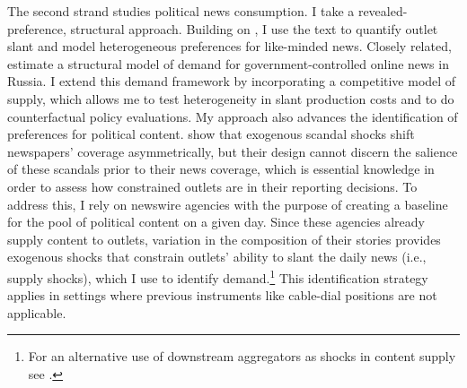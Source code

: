 \documentclass[12pt]{article}
\begin{document}
The second strand studies political news consumption. I take a revealed-preference, structural approach. Building on \citet{gentzkow2010media}, I use the text to quantify outlet slant and model heterogeneous preferences for like-minded news. Closely related, \citet{SimonovRao2022} estimate a structural model of demand for government-controlled online news in Russia. I extend this demand framework by incorporating a competitive model of supply, which allows me to test heterogeneity in slant production costs and to do counterfactual policy evaluations. My approach also advances the identification of preferences for political content. \citet{Puglisi2011NewspaperCO} show that exogenous scandal shocks shift  newspapers’ coverage asymmetrically, but their design cannot discern the salience of these scandals prior to their news coverage, which is essential knowledge in order to assess how constrained outlets are in their reporting decisions. To address this, I rely on newswire agencies with the purpose of creating a baseline for the pool of political content on a given day. Since these agencies already supply content to outlets, variation in the composition of their stories provides exogenous shocks that constrain outlets’ ability to slant the daily news (i.e., supply shocks), which I use to identify demand.\footnote{For an alternative use of downstream aggregators as shocks in content supply see \cite{milena}.} This identification strategy applies in settings where previous instruments like cable-dial positions \citep{martin2017} are not applicable.


\end{document}
